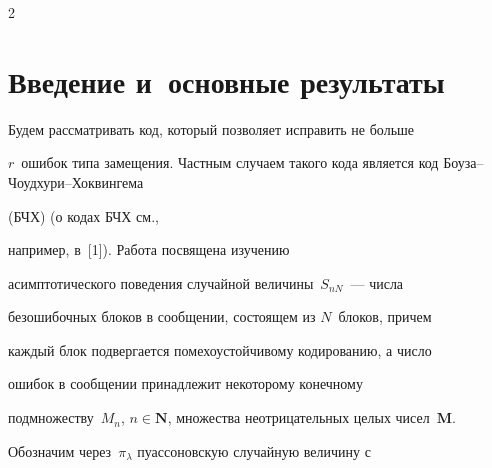 \vspace*{2pt}















      \thispagestyle{headings}





      \begin{multicols}{2}


      


            \label{st\stat}





  





\section{Введение и~основные результаты}





Будем рассматривать код, который позволяет исправить не больше 


$r$~ошибок типа замещения. Частным случаем такого кода является код Боу\-за--Чоуд\-ху\-ри--Хок\-вин\-ге\-ма


(БЧХ) (о кодах  БЧХ см., 


например, в~[1]). Работа посвящена изучению


асимптотического поведения  случайной величины~$S_{nN}$~--- чис\-ла


безошибочных блоков в сообщении, состоящем из $N$~блоков, причем


каждый блок подвергается помехоустойчивому кодированию, а число


ошибок в сообщении принадлежит некоторому конечному


 подмножеству~$M_n$, $n\in\mathbf{N}$, множества неотрицательных целых чисел~$\mathbf{M}$.





Обозначим через~$\pi_{\lambda}$ пуассоновскую случайную величину с



\end{multicols}
